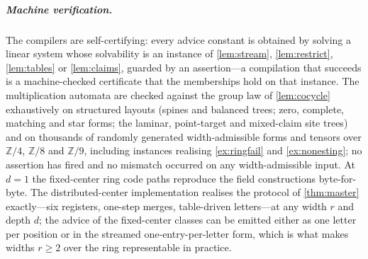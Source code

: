 \documentclass[a4paper,UKenglish,autoref,anonymous]{lipics-v2021}
\newcommand{\ZZ}{\mathbb{Z}}
\begin{document}
\subparagraph*{Machine verification.}
The compilers are self-certifying: every advice constant is obtained by
solving a linear system whose solvability is an instance of
\autoref{lem:stream}, \autoref{lem:restrict}, \autoref{lem:tables} or
\autoref{lem:claims}, guarded by an assertion---a compilation that
succeeds is a machine-checked certificate that the memberships hold on
that instance. The multiplication automata are checked against the
group law of \autoref{lem:cocycle} exhaustively on structured layouts
(spines and balanced trees; zero, complete, matching and star forms;
the laminar, point-target and mixed-claim site trees) and on thousands
of randomly generated width-admissible forms and tensors over $\ZZ/4$,
$\ZZ/8$ and $\ZZ/9$, including instances realising
\autoref{ex:ringfail} and \autoref{ex:nonesting}; no assertion has
fired and no mismatch occurred on any width-admissible input. At
$d = 1$ the fixed-center ring code paths reproduce the field
constructions byte-for-byte. The distributed-center implementation
realises the protocol of \autoref{thm:master} exactly---six registers,
one-step merges, table-driven letters---at any width $r$ and depth $d$;
the advice of the fixed-center classes can be emitted either as one
letter per position or in the streamed one-entry-per-letter form, which
is what makes widths $r \ge 2$ over the ring representable in
practice.
\end{document}
